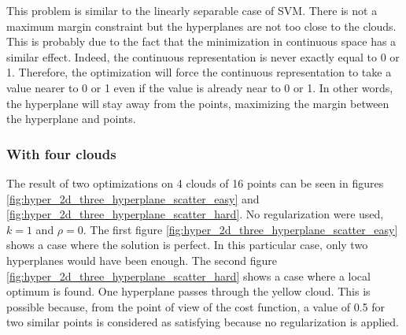 This problem is similar to the linearly separable case of SVM. There is not a maximum margin constraint but the hyperplanes are not too close to the clouds. This is probably due to the fact that the minimization in continuous space has a similar effect. Indeed, the continuous representation is never exactly equal to 0 or 1. Therefore, the optimization will force the continuous representation to take a value nearer to 0 or 1 even if the value is already near to 0 or 1. In other words, the hyperplane will stay away from the points, maximizing the margin between the hyperplane and points.

\subsubsection{With four clouds}
The result of two optimizations on 4 clouds of 16 points can be seen in figures \ref{fig:hyper_2d_three_hyperplane_scatter_easy} and \ref{fig:hyper_2d_three_hyperplane_scatter_hard}. No regularization were used, $k=1$ and $\rho=0$. The first figure \ref{fig:hyper_2d_three_hyperplane_scatter_easy} shows a case where the solution is perfect. In this particular case, only two hyperplanes would have been enough. The second figure \ref{fig:hyper_2d_three_hyperplane_scatter_hard} shows a case where a local optimum is found. One hyperplane passes through the yellow cloud. This is possible because, from the point of view of the cost function, a value of 0.5 for two similar points is considered as satisfying because no regularization is applied. 


